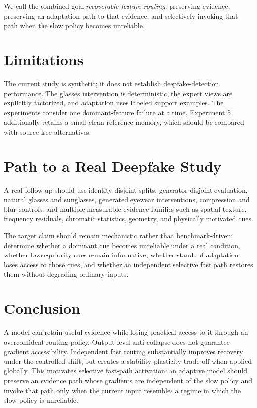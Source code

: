 \documentclass[10pt]{article}
\begin{document}
We call the combined goal \emph{recoverable feature routing}: preserving evidence, preserving an adaptation path to that evidence, and selectively invoking that path when the slow policy becomes unreliable.

\section{Limitations}

The current study is synthetic; it does not establish deepfake-detection performance. The glasses intervention is deterministic, the expert views are explicitly factorized, and adaptation uses labeled support examples. The experiments consider one dominant-feature failure at a time. Experiment 5 additionally retains a small clean reference memory, which should be compared with source-free alternatives.

\section{Path to a Real Deepfake Study}

A real follow-up should use identity-disjoint splits, generator-disjoint evaluation, natural glasses and sunglasses, generated eyewear interventions, compression and blur controls, and multiple measurable evidence families such as spatial texture, frequency residuals, chromatic statistics, geometry, and physically motivated cues.

The target claim should remain mechanistic rather than benchmark-driven: determine whether a dominant cue becomes unreliable under a real condition, whether lower-priority cues remain informative, whether standard adaptation loses access to those cues, and whether an independent selective fast path restores them without degrading ordinary inputs.

\section{Conclusion}

A model can retain useful evidence while losing practical access to it through an overconfident routing policy. Output-level anti-collapse does not guarantee gradient accessibility. Independent fast routing substantially improves recovery under the controlled shift, but creates a stability-plasticity trade-off when applied globally. This motivates selective fast-path activation: an adaptive model should preserve an evidence path whose gradients are independent of the slow policy and invoke that path only when the current input resembles a regime in which the slow policy is unreliable.
\end{document}
